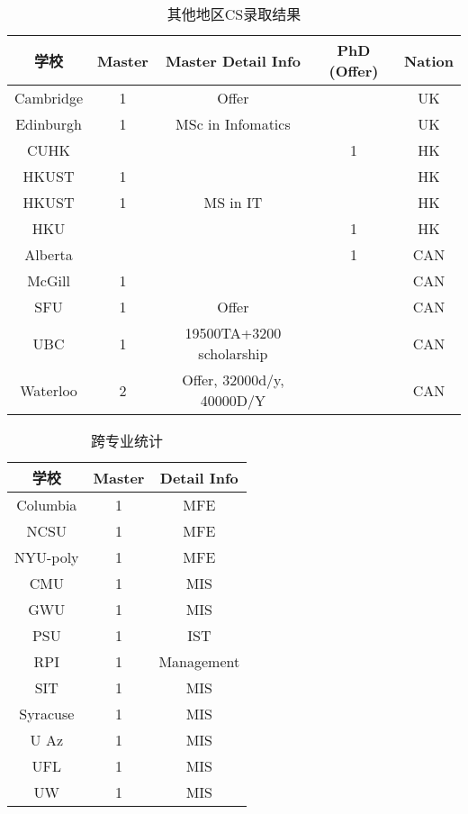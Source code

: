 \begin{center}
\begin{longtable}{|c|c|c|c|c|}
\caption{其他地区CS录取结果}\\
\hline
\textbf{学校} & \textbf{Master} & \textbf{Master Detail Info} & \textbf{PhD (Offer)} & \textbf{Nation} \\ \hline
Cambridge & 1 & Offer & ~ &	UK \\ \hline
Edinburgh & 1 & MSc in Infomatics & ~ & UK \\ \hline
CUHK & ~ & ~ & 1 & HK \\ \hline
HKUST & 1 & ~ & ~ & HK \\ \hline
HKUST & 1 & MS in IT & ~ & HK \\ \hline
HKU & ~ & ~ & 1 & HK \\ \hline
Alberta & ~ & ~ & 1 & CAN \\ \hline
McGill & 1 & ~ & ~ & CAN \\ \hline
SFU & 1 & Offer & ~ & CAN \\ \hline
UBC & 1 & 19500TA+3200 scholarship & ~ & CAN \\ \hline
Waterloo & 2 & Offer, 32000d/y, 40000D/Y & ~ & CAN \\ \hline

\end{longtable}

\begin{longtable}{|c|c|c|}
\caption{跨专业统计}\\
\hline
\textbf{学校} & \textbf{Master} & \textbf{Detail Info} \\ \hline
Columbia & 1 & MFE \\ \hline
NCSU & 1 & MFE \\ \hline
NYU-poly & 1 & MFE  \\ \hline
CMU	& 1	& MIS  \\ \hline
GWU	& 1 & MIS \\ \hline
PSU & 1 & IST  \\ \hline
RPI & 1 & Management \\ \hline
SIT	& 1 & MIS  \\ \hline
Syracuse & 1 & MIS  \\ \hline
U Az & 1 & MIS  \\ \hline
UFL	& 1	& MIS  \\ \hline
UW & 1 & MIS \\ \hline
\end{longtable}
\end{center}
\clearpage